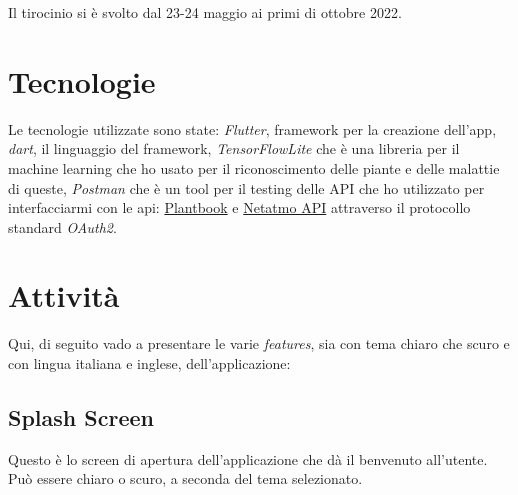 \documentclass[a4paper,12pt]{report}
\begin{document}
\textsf{\small Il tirocinio si è svolto dal 23-24 maggio ai primi di ottobre 2022.} %

\section{Tecnologie}

\textsf{\small Le tecnologie utilizzate sono state: \emph{Flutter}, framework per la creazione dell'app, \emph{dart}, il linguaggio del framework, \emph{TensorFlowLite} che è una libreria per il machine learning che ho usato per il riconoscimento delle piante e delle malattie di queste, \emph{Postman} che è un tool per il testing delle API che ho utilizzato per interfacciarmi con le api: \href{open.plantbook.io}{Plantbook} e \href{https://dev.netatmo.com/apidocumentation/oauth}{Netatmo API} attraverso il protocollo standard \emph{OAuth2}.}


\section{Attività}

\textsf{\small Qui, di seguito vado a presentare le varie \emph{features}, sia con tema chiaro che scuro e con lingua italiana e inglese, dell'applicazione: } %

\subsection{Splash Screen}

\textsf{\small Questo è lo screen di apertura dell'applicazione che dà il benvenuto all'utente.}
\textsf{\small Può essere chiaro o scuro, a seconda del tema selezionato.}
\end{document}

